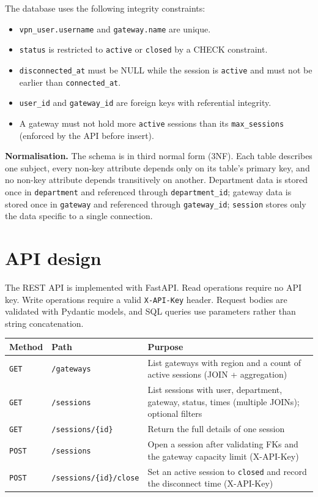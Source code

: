 \documentclass[11pt,a4paper]{article}
\begin{document}
The database uses the following integrity constraints:

\begin{itemize}[topsep=2pt]
  \item \texttt{vpn\_user.username} and \texttt{gateway.name} are unique.
  \item \texttt{status} is restricted to \texttt{active} or \texttt{closed} by a
        CHECK constraint.
  \item \texttt{disconnected\_at} must be NULL while the session is
        \texttt{active} and must not be earlier than \texttt{connected\_at}.
  \item \texttt{user\_id} and \texttt{gateway\_id} are foreign keys with
        referential integrity.
  \item A gateway must not hold more \texttt{active} sessions than its
        \texttt{max\_sessions} (enforced by the API before insert).
\end{itemize}

\textbf{Normalisation.} The schema is in third normal form (3NF). Each table
describes one subject, every non-key attribute depends only on its table's
primary key, and no non-key attribute depends transitively on another.
Department data is stored once in \texttt{department} and referenced through
\texttt{department\_id}; gateway data is stored once in \texttt{gateway} and
referenced through \texttt{gateway\_id}; \texttt{session} stores only the data
specific to a single connection.

\section{API design}

The REST API is implemented with FastAPI. Read operations require no API key.
Write operations require a valid \texttt{X-API-Key} header. Request bodies are
validated with Pydantic models, and SQL queries use parameters rather than
string concatenation.

\renewcommand{\arraystretch}{1.2}
\begin{tabularx}{\linewidth}{@{}p{2cm}p{4.6cm}X@{}}
\toprule
\textbf{Method} & \textbf{Path} & \textbf{Purpose} \\
\midrule
\texttt{GET}  & \texttt{/gateways}               & List gateways with region and a count of active sessions (JOIN + aggregation) \\
\texttt{GET}  & \texttt{/sessions}               & List sessions with user, department, gateway, status, times (multiple JOINs); optional filters \\
\texttt{GET}  & \texttt{/sessions/\{id\}}        & Return the full details of one session \\
\texttt{POST} & \texttt{/sessions}               & Open a session after validating FKs and the gateway capacity limit (X-API-Key) \\
\texttt{POST} & \texttt{/sessions/\{id\}/close}  & Set an active session to \texttt{closed} and record the disconnect time (X-API-Key) \\
\bottomrule
\end{tabularx}
\end{document}
